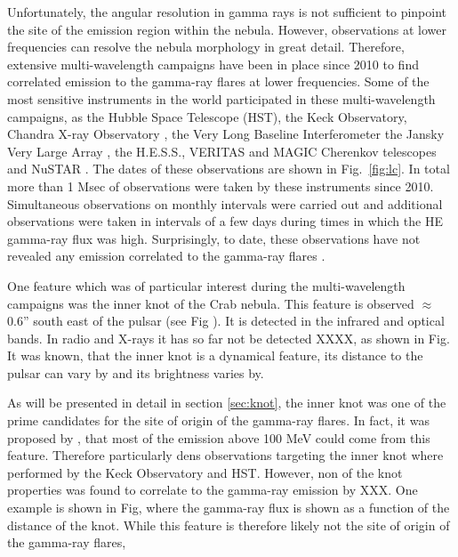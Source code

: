 Unfortunately, the angular resolution in gamma rays is not sufficient to pinpoint the site of the emission region within the nebula. However, observations at lower frequencies can resolve the nebula morphology in great detail. Therefore, extensive multi-wavelength campaigns have been in place since 2010 to find correlated emission to the gamma-ray flares at lower frequencies. Some of the most sensitive instruments in the world participated in these multi-wavelength campaigns, as the Hubble Space Telescope (HST), the Keck Observatory, Chandra X-ray Observatory \citep{Weisskopf2013,rudy2015}, the Very Long Baseline Interferometer \citep{Lobanov2011}  the Jansky Very Large Array \citep{Bietenholz2014}, the H.E.S.S., VERITAS and MAGIC Cherenkov telescopes \citep{Abramowski2014,Aliu2014,Aleksic2015} and NuSTAR \citep{Madsen2015}. The dates of these observations are shown in Fig.~\ref{fig:lc}. In total more than 1 Msec of observations were taken by these  instruments since 2010. Simultaneous observations on monthly intervals were carried out and additional observations were taken in intervals of a few days during times in which the HE gamma-ray flux was high. Surprisingly, to date, these observations have not revealed any emission correlated to the gamma-ray flares \citep{Weisskopf2013,rudy2015}. 

One feature which was of particular interest during the multi-wavelength campaigns was the inner knot of the Crab nebula. This feature is observed $\approx$0.6'' south east of the pulsar (see Fig ). It is detected in the infrared and optical bands. In radio and X-rays it has so far not be detected XXXX, as shown in Fig. It was known, that the inner knot is a dynamical feature, its distance to the pulsar can vary by and its brightness varies by. 


As will be presented in detail in section \ref{sec:knot}, the inner knot was one of the prime candidates for the site of origin of the gamma-ray flares. In fact, it was proposed by , that most of the emission above 100 MeV could come from this feature. Therefore particularly dens observations targeting the inner knot where performed by the Keck Observatory and HST. However, non of the knot properties was found to correlate to the gamma-ray emission by XXX. One example is shown in Fig, where the gamma-ray flux is shown as a function of the distance of the knot. While this feature is therefore likely not the site of origin of the gamma-ray flares,  
